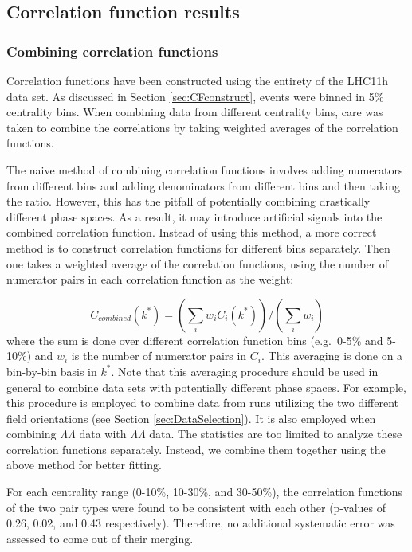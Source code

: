 \subsection{Correlation function results}
\label{sec:CorrelationFunctionResults}
\subsubsection{Combining correlation functions}
\label{sec:CFCombining}

Correlation functions have been constructed using the entirety of the LHC11h data set.  
As discussed in Section \ref{sec:CFconstruct}, events were binned in 5\% centrality bins.  
When combining data from different centrality bins, care was taken to combine the correlations by taking weighted averages of the correlation functions.  

The naive method of combining correlation functions involves adding numerators from different bins and adding denominators from different bins and then taking the ratio.  
However, this has the pitfall of potentially combining drastically different phase spaces.  
As a result, it may introduce artificial signals into the combined correlation function.  
Instead of using this method, a more correct method is to construct correlation functions for different bins separately.  
Then one takes a weighted average of the correlation functions, using the number of numerator pairs in each correlation function as the weight:

\begin{equation}
\label{eq:CombineCF}
C_{combined}(k^*) = (\displaystyle\sum\limits_{i} w_i C_i(k^*))/(\displaystyle\sum\limits_{i} w_i)
\end{equation}
where the sum is done over different correlation function bins (e.g.\ 0-5\% and 5-10\%) and $w_i$ is the number of numerator pairs in $C_i$.  
This averaging is done on a bin-by-bin basis in $k^*$.  
Note that this averaging procedure should be used in general to combine data sets with potentially different phase spaces. 
For example, this procedure is employed to combine data from runs utilizing the two different field orientations (see Section \ref{sec:DataSelection}).  
It is also employed when combining $\Lambda\Lambda$ data with $\bar{\Lambda}\bar{\Lambda}$ data.  
The statistics are too limited to analyze these correlation functions separately. Instead, we combine them together using the above method for better fitting.

For each centrality range (0-10\%, 10-30\%, and 30-50\%), the correlation functions of the two pair types were found to be consistent with each other (p-values of 0.26, 0.02, and 0.43 respectively).  
Therefore, no additional systematic error was assessed to come out of their merging.

